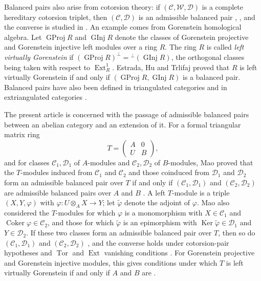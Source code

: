 \documentclass[11pt]{amsart}
\theoremstyle{definition}
\theoremstyle{remark}
\theoremstyle{plain}
\numberwithin{equation}{section}
\begin{document}
Balanced pairs also arise from cotorsion theory: if $(\mathcal{C}, \mathcal{W}, \mathcal{D})$ is a
complete hereditary cotorsion triplet, then $(\mathcal{C}, \mathcal{D})$ is an admissible
balanced pair \cite[Theorem~4.1]{EJTX}, \cite[Proposition~2.6]{Chen}, and
the converse is studied in \cite{EPZ}. An example comes from Gorenstein
homological algebra. Let $\operatorname{GProj} R$ and $\operatorname{GInj} R$ denote the classes of
Gorenstein projective and Gorenstein injective left modules over a ring
$R$. The ring $R$ is called \emph{left virtually Gorenstein}
\cite{BeligiannisReiten,EPZ} if
$(\operatorname{GProj} R)^\perp = {}^\perp(\operatorname{GInj} R)$, the orthogonal classes being taken
with respect to $\operatorname{Ext}^1_R$. Estrada, Hu and
Trlifaj \cite{EHT} proved that $R$ is left virtually Gorenstein if and
only if $(\operatorname{GProj} R, \operatorname{GInj} R)$ is a balanced pair. Balanced pairs have
also been defined in triangulated categories \cite{FuHuZhangZhu} and in
extriangulated categories \cite{HeZhou,XuFu}.

The present article is concerned with the passage of admissible balanced
pairs between an abelian category and an extension of it. For a formal
triangular matrix ring
\[
 T = \begin{pmatrix}A & 0\\ U & B\end{pmatrix},
\]
and for classes $\mathcal{C}_1, \mathcal{D}_1$ of $A$-modules and
$\mathcal{C}_2, \mathcal{D}_2$ of $B$-modules, Mao proved that the
$T$-modules induced from $\mathcal{C}_1$ and $\mathcal{C}_2$ and those
coinduced from $\mathcal{D}_1$ and $\mathcal{D}_2$ form an admissible balanced
pair over $T$ if and only if $(\mathcal{C}_1, \mathcal{D}_1)$ and
$(\mathcal{C}_2, \mathcal{D}_2)$ are admissible balanced pairs over $A$ and
$B$ \cite[Theorem~2.2]{Mao}. A left $T$-module is a triple $(X, Y, \varphi)$
with $\varphi: U \otimes_A X \to Y$; let $\widetilde\varphi$ denote the
adjoint of $\varphi$. Mao also considered the $T$-modules for which $\varphi$
is a monomorphism with $X \in \mathcal{C}_1$ and
$\operatorname{Coker}\varphi \in \mathcal{C}_2$, and those for which
$\widetilde\varphi$ is an epimorphism with
$\operatorname{Ker}\widetilde\varphi \in \mathcal{D}_1$ and
$Y \in \mathcal{D}_2$. If these two classes form an admissible balanced pair
over $T$, then so do $(\mathcal{C}_1, \mathcal{D}_1)$ and
$(\mathcal{C}_2, \mathcal{D}_2)$ \cite[Proposition~2.4]{Mao}, and the
converse holds under cotorsion-pair hypotheses and $\operatorname{Tor}$ and
$\operatorname{Ext}$ vanishing conditions \cite[Theorem~2.5]{Mao}. For
Gorenstein projective and Gorenstein injective modules, this gives
conditions under which $T$ is left virtually Gorenstein if and only if $A$
and $B$ are \cite[Theorem~2.8]{Mao}.
\end{document}

